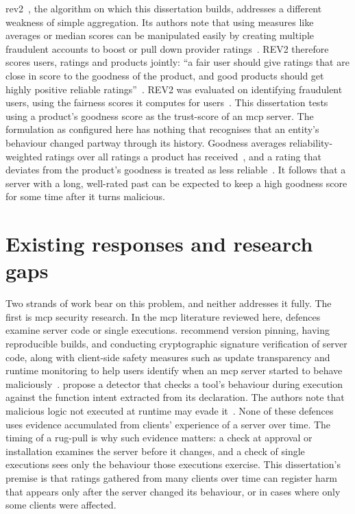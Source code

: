 \gls{rev2}~\cite{Kumar2018}, the  algorithm on which this dissertation builds, addresses a different weakness of simple aggregation. Its authors note that using measures like averages or median scores can be manipulated easily by creating multiple fraudulent accounts to boost or pull down provider ratings~\cite[p.~335]{Kumar2018}. REV2 therefore scores users, ratings and products jointly: \enquote{a fair user should give ratings that are close in score to the goodness of the product, and good products should get highly positive reliable ratings}~\cite[p.~333]{Kumar2018}. REV2 was evaluated on identifying fraudulent users, using the \gls{fairness} scores it computes for users~\cite[p.~333]{Kumar2018}. This dissertation tests using a product's \gls{goodness} score as the \gls{trust-score} of an \gls{mcp} server. The formulation as configured here has nothing that recognises that an entity’s behaviour changed partway through its history. Goodness averages reliability-weighted ratings over all ratings a product has received~\cite[p.~336]{Kumar2018}, and a rating that deviates from the product’s goodness is treated as less reliable~\cite[p.~335]{Kumar2018}. It follows that a server with a long, well-rated past can be expected to keep a high goodness score for some time after it turns malicious.

\section{Existing responses and research gaps}\label{sec:gap}

Two strands of work bear on this problem, and neither addresses it fully. The first is \gls{mcp} security research. In the \gls{mcp} literature reviewed here, defences examine server code or single executions. \textcite{Hou2026} recommend version pinning, having reproducible builds, and conducting cryptographic signature verification of server code, along with client-side safety measures such as update transparency and runtime monitoring to help users identify when an \gls{mcp} server started to behave maliciously~\cite[p.~19]{Hou2026}. \textcite{Huang2026} propose a detector that checks a tool's behaviour during execution against the function intent extracted from its declaration. The authors note that malicious logic not executed at runtime may evade it~\cite[pp.~1, 25]{Huang2026}. None of these defences uses evidence accumulated from clients' experience of a server over time. The timing of a \gls{rug-pull} is why such evidence matters: a check at approval or installation examines the server before it changes, and a check of single executions sees only the behaviour those executions exercise. This dissertation's premise is that ratings gathered from many clients over time can register harm that appears only after the server changed its behaviour, or in cases where only some clients were affected.

